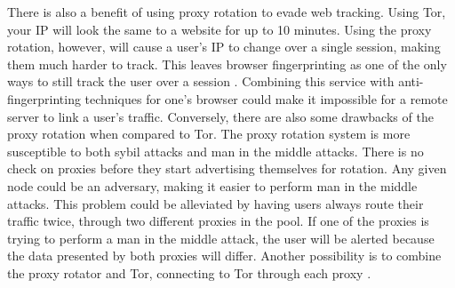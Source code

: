 There is also a benefit of using proxy rotation to evade web tracking. Using Tor, your IP will look the same to a website for up to 10 minutes\cite{tor:faq}. Using the proxy rotation, however, will cause a user's IP to change over a single session, making them much harder to track. This leaves browser fingerprinting as one of the only ways to still track the user over a session . Combining this service with anti-fingerprinting techniques for one's browser could make it impossible for a remote server to link a user's traffic.
    Conversely, there are also some drawbacks of the proxy rotation when compared to Tor. The proxy rotation system is more susceptible to both sybil attacks and man in the middle attacks. There is no check on proxies before they start advertising themselves for rotation. Any given node could be an adversary, making it easier to perform man in the middle attacks. This problem could be alleviated by having users always route their traffic twice, through two different proxies in the pool. If one of the proxies is trying to perform a man in the middle attack, the user will be alerted because the data presented by both proxies will differ. Another possibility is to combine the proxy rotator and Tor, connecting to Tor through each proxy . 

